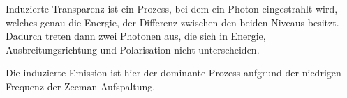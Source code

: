 Induzierte Transparenz ist ein Prozess, bei dem ein Photon eingestrahlt wird, welches genau die Energie, der Differenz zwischen den beiden Niveaus besitzt. Dadurch treten dann zwei Photonen aus, die sich in Energie, Ausbreitungsrichtung und Polarisation nicht unterscheiden. 

Die induzierte Emission ist hier der dominante Prozess aufgrund der niedrigen Frequenz der Zeeman-Aufspaltung. 









